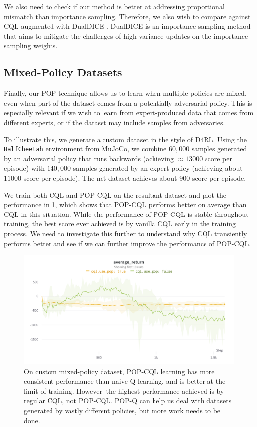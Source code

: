 We also need to check if our method is better at addressing proportional mismatch than importance sampling. Therefore, we also wish to compare against CQL augmented with DualDICE \citep{nachum2019dualdice}. DualDICE is an importance sampling method that aims to mitigate the challenges of high-variance updates on the importance sampling weights.




\subsection{Mixed-Policy Datasets}

Finally, our POP technique allows us to learn when multiple policies are mixed, even when part of the dataset comes from a potentially adversarial policy. This is especially relevant if we wish to learn from expert-produced data that comes from different experts, or if the dataset may include samples from adversaries.

To illustrate this, we generate a custom dataset in the style of D4RL. Using the \texttt{HalfCheetah} environment from MuJoCo, we combine $60,000$ samples generated by an adversarial policy that runs backwards (achieving $\approx13000$ score per episode) with $140,000$ samples generated by an expert policy (achieving about $11000$ score per episode). The net dataset achieves about 900 score per episode.

We train both CQL and POP-CQL on the resultant dataset and plot the performance in \cref{fig:fwdback}, which shows that POP-CQL performs better on average than CQL in this situation. While the performance of POP-CQL is stable throughout training, the best score ever achieved is by vanilla CQL early in the training process. We need to investigate this further to understand why CQL transiently performs better and see if we can further improve the performance of POP-CQL.

\begin{figure}[t]
  \centering
  \includegraphics[width=\textwidth]{poptd/fwdback/mixedexpert.png}
  \caption{
    On custom mixed-policy dataset, POP-CQL learning has more consistent performance than naive Q learning, and is better at the limit of training. However, the highest performance achieved is by regular CQL, not POP-CQL. POP-Q can help us deal with datasets generated by vastly different policies, but more work needs to be done.
  }
  \label{fig:fwdback}
\end{figure}

